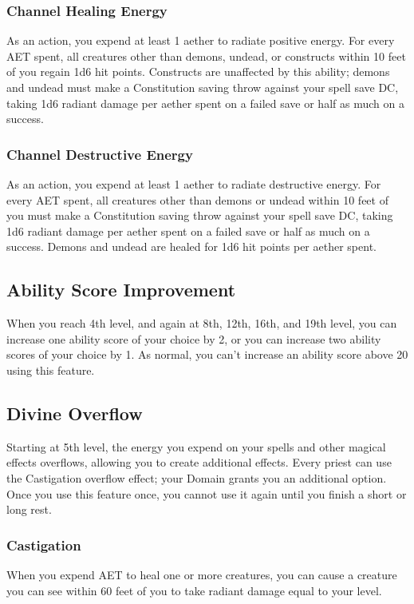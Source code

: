 \subsubsection{Channel Healing Energy}
As an action, you expend at least 1 aether to radiate positive energy. For every AET spent, all creatures other than demons, undead, or constructs within 10 feet of you regain 1d6 hit points. Constructs are unaffected by this ability; demons and undead must make a Constitution saving throw against your spell save DC, taking 1d6 radiant damage per aether spent on a failed save or half as much on a success.

\subsubsection{Channel Destructive Energy}
As an action, you expend at least 1 aether to radiate destructive energy. For every AET spent, all creatures other than demons or undead within 10 feet of you must make a Constitution saving throw against your spell save DC, taking 1d6 radiant damage per aether spent on a failed save or half as much on a success. Demons and undead are healed for 1d6 hit points per aether spent.

\subsection{Ability Score Improvement}

When you reach 4th level, and again at 8th, 12th, 16th, and 19th level, you can increase one ability score of your choice by 2, or you can increase two ability scores of your choice by 1. As normal, you can't increase an ability score above 20 using this feature.

\subsection{Divine Overflow}

Starting at 5th level, the energy you expend on your spells and other magical effects overflows, allowing you to create additional effects. Every priest can use the Castigation overflow effect; your Domain grants you an additional option. Once you use this feature once, you cannot use it again until you finish a short or long rest.

\subsubsection{Castigation}
When you expend AET to heal one or more creatures, you can cause a creature you can see within 60 feet of you to take radiant damage equal to your level.

